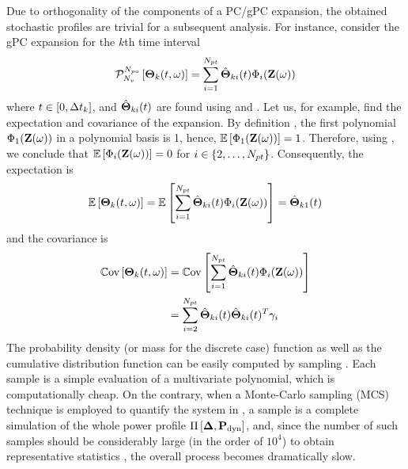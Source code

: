 Due to orthogonality of the components of a PC/gPC expansion, the obtained stochastic profiles are trivial for a subsequent analysis. For instance, consider the gPC expansion for the $k$th time interval
\begin{equation} \elabel{pc-k}
  \oPC{\vars}{\pcorder}{\vTO_k(\t, \o)} = \sum_{i = 1}^{\pcterms} \pcc{\vTO}_{ki}(\t) \pcb_i(\vZ(\o))
\end{equation}
where $t \in [0, \Delta t_k]$, and $\hat{{\boldsymbol\Theta}}_{ki}(t)$ are found using  and . Let us, for example, find the expectation and covariance of the expansion. By definition \cite{xiu2002}, the first polynomial $\Phi_1(\mathbf{Z}(\omega))$ in a polynomial basis is 1, hence, $\mathbb{E}\left[\Phi_1(\mathbf{Z}(\omega))\right] = 1$. Therefore, using , we conclude that $\mathbb{E}\left[\Phi_i(\mathbf{Z}(\omega))\right] = 0$ for $i \in \{ 2, \dotsc, {N_{pt}} \}$. Consequently, the expectation is
\[
  \mathbb{E}\left[{\boldsymbol\Theta}_k(t, \omega)\right] = \mathbb{E}\left[\sum_{i = 1}^{{N_{pt}}} \hat{{\boldsymbol\Theta}}_{ki}(t) \Phi_i(\mathbf{Z}(\omega))\right] = \hat{{\boldsymbol\Theta}}_{k1}(t)
\]
and the covariance is
\begin{align*}
  \mathbb{C}\text{ov}\left[{\boldsymbol\Theta}_k(t, \omega)\right] & = \mathbb{C}\text{ov}\left[\sum_{i = 1}^{{N_{pt}}} \hat{{\boldsymbol\Theta}}_{ki}(t) \Phi_i(\mathbf{Z}(\omega))\right] \\
  & = \sum_{i = 2}^{{N_{pt}}} \hat{{\boldsymbol\Theta}}_{ki}(t) \hat{{\boldsymbol\Theta}}_{ki}(t)^T \gamma_i
\end{align*}
The probability density (or mass for the discrete case) function as well as the cumulative distribution function can be easily computed by sampling . Each sample is a simple evaluation of a multivariate polynomial, which is computationally cheap. On the contrary, when a Monte-Carlo sampling (MCS) technique is employed to quantify the system in , a sample is a complete simulation of the whole power profile $\prof{\mP_\dyn}$, and, since the number of such samples should be considerably large (in the order of $10^4$) to obtain representative statistics \cite{xiu2009}, the overall process becomes dramatically slow.
